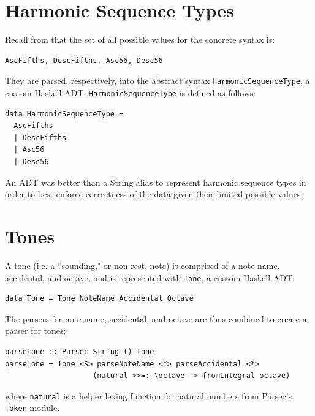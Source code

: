 \documentclass{report}
\newcommand\param[1]{\textttu{<#1>}}
\begin{document}
\section{Harmonic Sequence Types}
Recall from   that the set of all possible values for the concrete syntax \param{HARMSEQTYPE} is:

\begin{verbatim}
AscFifths, DescFifths, Asc56, Desc56
\end{verbatim}

They are parsed, respectively, into the abstract syntax \verb.HarmonicSequenceType., a custom Haskell ADT. \verb.HarmonicSequenceType. is defined as follows:

\begin{verbatim}
data HarmonicSequenceType = 
  AscFifths
  | DescFifths
  | Asc56 
  | Desc56
\end{verbatim}

An ADT was better than a String alias to represent harmonic sequence types in order to best enforce correctness of the data given their limited possible values. 
\section{Tones}
\label{sec:tones}

A tone (i.e. a ``sounding," or non-rest, note) is comprised of a note name, accidental, and octave, and is represented with \verb.Tone., a custom Haskell ADT:

\begin{verbatim}
data Tone = Tone NoteName Accidental Octave 
\end{verbatim}

The parsers for note name, accidental, and octave are thus combined to create a parser for tones:

\begin{verbatim}
parseTone :: Parsec String () Tone 
parseTone = Tone <$> parseNoteName <*> parseAccidental <*> 
		            (natural >>=: \octave -> fromIntegral octave)
\end{verbatim}
where \verb.natural. is a helper lexing function for natural numbers from Parsec's \verb.Token. module.
\end{document}
